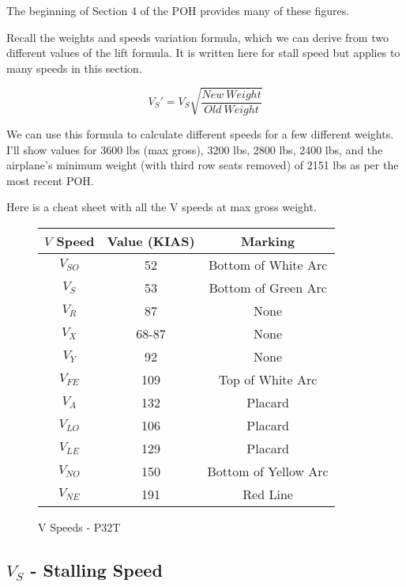 The beginning of Section 4 of the POH provides many of these figures.

Recall the weights and speeds variation formula, which we can derive from two different values of the lift formula. It is written here for stall speed but applies to many speeds in this section.

\begin{equation}
V_S' = V_S \sqrt{\frac{New\ Weight}{Old\ Weight}}
\end{equation}

We can use this formula to calculate different speeds for a few different weights. I'll show values for 3600 lbs (max gross), 3200 lbs, 2800 lbs, 2400 lbs, and the airplane's minimum weight (with third row seats removed) of 2151 lbs as per the most recent POH.

Here is a cheat sheet with all the V speeds at max gross weight.

\begin{figure}
\begin{center}
\begin{tabular}{ |c|c|c| }
    \hline
    $V$ Speed & Value (KIAS) & Marking\\
    \hline
    \hline
     $V_{SO}$ &  52 & Bottom of White Arc \\
     $V_S$    &  53 & Bottom of Green Arc \\
    \hline
     $V_R$    &  87 & None \\
    \hline
     $V_X$    &  68-87 & None \\
     $V_Y$    &  92    & None \\
    \hline
     $V_{FE}$ &  109 & Top of White Arc \\
     $V_A$    &  132 & Placard \\
    \hline
     $V_{LO}$ &  106 & Placard \\
     $V_{LE}$ &  129 & Placard \\
    \hline
     $V_{NO}$ &  150 & Bottom of Yellow Arc \\
     $V_{NE}$ &  191 & Red Line \\
    \hline
\end{tabular}
\end{center}
\caption{V Speeds - P32T}
\label{fig:VSpeedsP32T}
\end{figure}

\subsection{$V_{S}$ - Stalling Speed}

